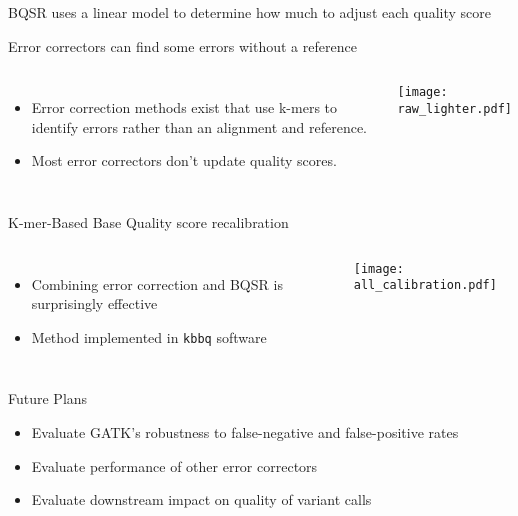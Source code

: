 \documentclass{beamer}
\begin{document}
\begin{frame}{BQSR uses a linear model to determine how much to adjust each quality score}
\end{frame}

\begin{frame}{Error correctors can find some errors without a reference}
\begin{columns}
\begin{itemize}
\item Error correction methods exist that use k-mers to identify errors rather than an alignment and reference.
\item Most error correctors don't update quality scores.
\end{itemize}

\texttt{[image: raw\_lighter.pdf]}
\end{columns}
\end{frame}

\begin{frame}{K-mer-Based Base Quality score recalibration}
\begin{columns}
\begin{itemize}
\item Combining error correction and BQSR is surprisingly effective
\item Method implemented in \texttt{kbbq} software
\end{itemize}
\texttt{[image: all\_calibration.pdf]}
\end{columns}
\end{frame}

\begin{frame}{Future Plans}
\begin{itemize}
\item Evaluate GATK's robustness to false-negative and false-positive rates
\item Evaluate performance of other error correctors
\item Evaluate downstream impact on quality of variant calls
\end{itemize}
\end{frame}
\end{document}
